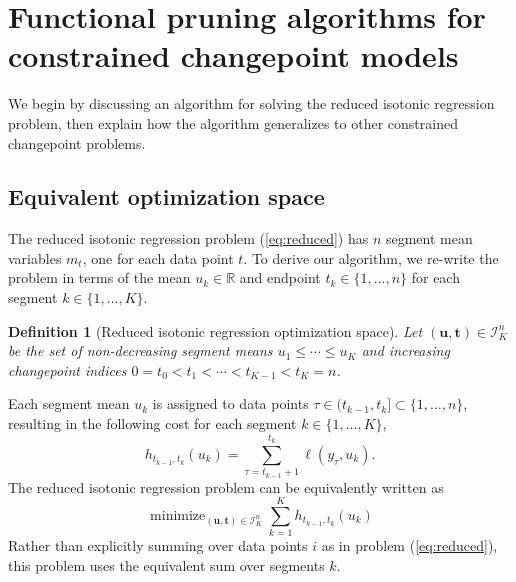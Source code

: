 \documentclass{article}
\newtheorem{definition}{Definition}
\DeclareMathOperator*{\minimize}{minimize}
\newcommand{\RR}{\mathbb R}
\begin{document}
\newcommand{\FCC}{C}
\newcommand{\M}{\mathcal{M}}
\section{Functional 
pruning algorithms for constrained
  changepoint models}
\label{sec:algorithms}



We begin by discussing an algorithm for solving the reduced isotonic
regression problem, then explain how the algorithm
generalizes to other constrained changepoint problems.

\subsection{Equivalent optimization space}

The reduced isotonic regression problem (\ref{eq:reduced}) has $n$
segment mean variables $m_t$, one for each data point $t$. To derive
our algorithm, we re-write the problem in terms of the mean
$u_k\in\RR$ and endpoint $t_k\in\{1,\dots,n\}$ for each
segment $k\in\{1,\dots, K\}$.
\begin{definition}[Reduced isotonic regression optimization space]
\label{def:Ibar}
  Let $(\mathbf u, \mathbf t)\in{\mathcal I}^n_K$ be the set of
  non-decreasing segment means $u_1\leq\cdots\leq u_K$ and
  increasing changepoint indices $0=t_0<t_1<\cdots<t_{K-1}<t_K=n$.
\end{definition}
Each segment mean $u_k$ is assigned to data points
$\tau\in(t_{k-1},t_k]\subset\{1,\dots,n\}$, resulting in the following
cost for each segment $k\in\{1, \dots, K\}$, 
\begin{equation}
  \label{eq:h}
  h_{t_{k-1}, t_k}(u_k) = \sum_{\tau=t_{k-1}+1}^{t_k} \ell(y_\tau, u_k).
\end{equation}
The reduced isotonic regression problem can be equivalently written as
\begin{equation}
  \label{eq:isotonic_ut}
  \minimize_{(\mathbf u, \mathbf t)\in{\mathcal I}^n_K}
  \sum_{k=1}^K
  h_{t_{k-1}, t_k}(u_k)
\end{equation}
Rather than explicitly summing over data points $i$ as in problem
(\ref{eq:reduced}), this problem uses the equivalent sum over segments $k$. 
\end{document}
